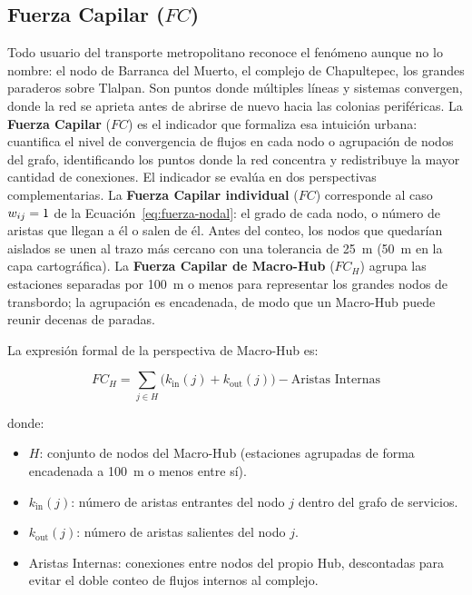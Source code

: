 \subsection{Fuerza Capilar (\texorpdfstring{$FC$}{FC})}
\label{subsec:fuerza-capilar}

Todo usuario del transporte metropolitano reconoce el fenómeno aunque no lo
nombre: el nodo de Barranca del Muerto, el complejo de Chapultepec, los grandes
paraderos sobre Tlalpan. Son puntos donde múltiples líneas y sistemas convergen,
donde la red se aprieta antes de abrirse de nuevo hacia las colonias
periféricas. La \textbf{Fuerza Capilar} ($FC$) es el indicador que formaliza esa
intuición urbana: cuantifica el nivel de convergencia de flujos en cada nodo o
agrupación de nodos del grafo, identificando los puntos donde la red concentra y
redistribuye la mayor cantidad de conexiones. El indicador se evalúa en dos
perspectivas complementarias. La \textbf{Fuerza Capilar individual} ($FC$)
corresponde al caso $w_{ij} = 1$ de la Ecuación~\eqref{eq:fuerza-nodal}: el
grado de cada nodo, o número de aristas que llegan a él o salen de él. Antes del
conteo, los nodos que quedarían aislados se unen al trazo más cercano con una
tolerancia de 25~m (50~m en la capa cartográfica). La
\textbf{Fuerza Capilar de Macro-Hub} ($FC_H$) agrupa las estaciones separadas
por 100~m o menos para representar los grandes nodos de transbordo; la
agrupación es encadenada, de modo que un Macro-Hub puede reunir decenas de
paradas.

La expresión formal de la perspectiva de Macro-Hub es:

\begin{equation}
    FC_{H} = \sum_{j \in H}
    \bigl(k_{\text{in}}(j) + k_{\text{out}}(j)\bigr)
    - \text{Aristas Internas}
    \label{eq:fc-geografica}
\end{equation}

\noindent donde:
\begin{itemize}
    \item $H$: conjunto de nodos del Macro-Hub (estaciones agrupadas de forma
          encadenada a 100~m o menos entre sí).
    \item $k_{\text{in}}(j)$: número de aristas entrantes del nodo $j$
          dentro del grafo de servicios.
    \item $k_{\text{out}}(j)$: número de aristas salientes del nodo $j$.
    \item Aristas Internas: conexiones entre nodos del propio Hub,
          descontadas para evitar el doble conteo de flujos internos
          al complejo.
\end{itemize}

